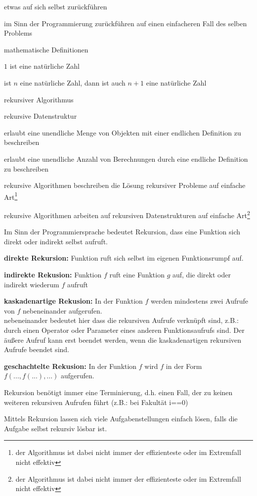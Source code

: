 \begin{compactitem}
	\item {\flqq etwas auf sich selbst zurückführen\frqq}
	\item im Sinn der Programmierung {\flqq zurückführen auf einen einfacheren Fall des selben Problems\frqq}
	\item mathematische Definitionen
	\begin{compactitem}
		\item $1$ ist eine natürliche Zahl
		\item ist $n$ eine natürliche Zahl, dann ist auch $n+1$ eine natürliche Zahl
	\end{compactitem}
	\item rekursiver Algorithmus
	\item rekursive Datenstruktur
	\item erlaubt eine unendliche Menge von Objekten mit einer endlichen Definition zu beschreiben
	\item erlaubt eine unendliche Anzahl von Berechnungen durch eine endliche Definition zu beschreiben
	\item rekursive Algorithmen beschreiben die Lösung {\flqq rekursiver\frqq} Probleme auf einfache Art\footnote{der Algorithmus ist dabei nicht immer der effizienteste oder im Extremfall nicht effektiv}
	\item rekursive Algorithmen arbeiten auf rekursiven Datenstrukturen auf einfache Art\footnote{der Algorithmus ist dabei nicht immer der effizienteste oder im Extremfall nicht effektiv}
	\item Im Sinn der Programmiersprache bedeutet Rekursion, dass eine Funktion sich direkt oder indirekt selbst aufruft.
	\item {\bf direkte Rekursion:} Funktion ruft sich selbst im eigenen Funktionsrumpf auf.
	\item {\bf indirekte Rekusion:} Funktion $f$ ruft eine Funktion $g$ auf, die direkt oder indirekt wiederum $f$ aufruft
	\item {\bf kaskadenartige Rekusion:} In der Funktion $f$ werden mindestens zwei Aufrufe von $f$ {\flqq nebeneinander\frqq} aufgerufen.\\
	{\flqq nebeneinander\frqq} bedeutet hier dass die rekursiven Aufrufe verknüpft sind, z.B.: durch einen Operator oder Parameter eines anderen Funktionsaufrufs sind. Der äußere Aufruf kann erst beendet werden, wenn die kaskadenartigen rekursiven Aufrufe beendet sind.
	\item {\bf geschachtelte Rekusion:} In der Funktion $f$ wird $f$ in der Form $f(..., f(...), ...)$ aufgerufen.
	\item Rekursion benötigt immer eine Terminierung, d.h. einen Fall, der zu keinen weiteren rekursiven Aufrufen führt (z.B.: bei Fakultät i==0)
	\item Mittels Rekursion lassen sich viele Aufgabenstellungen {\flqq einfach\frqq} lösen, falls die Aufgabe selbst rekursiv lösbar ist.
\end{compactitem}

